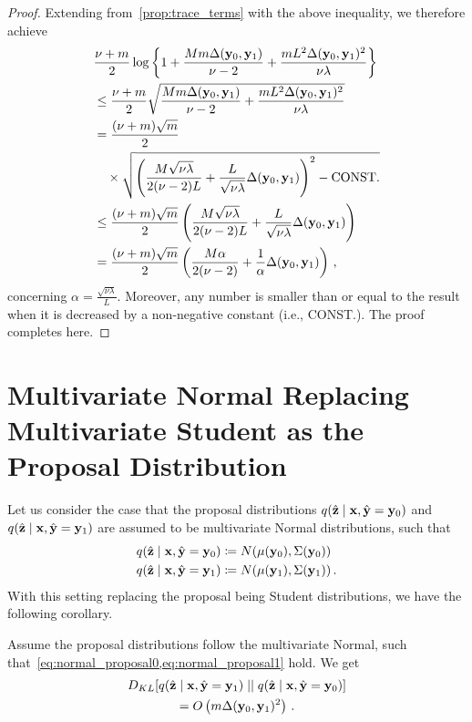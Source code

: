 {\begin{proof}
Extending from~\cref{prop:trace_terms} with the above inequality, we therefore achieve  
\begin{align*}
&\frac{\nu+m}{2} \log \left\{ 1 + \frac{M m \Delta(\mathbf{y}_0, \mathbf{y}_1)}{\nu-2} + \frac{m L^2 \Delta(\mathbf{y}_0, \mathbf{y}_1)^2}{\nu \lambda} \right\} \\
&\le \frac{\nu+m}{2} \sqrt{ \frac{M m \Delta(\mathbf{y}_0, \mathbf{y}_1)}{\nu-2} + \frac{m L^2 \Delta(\mathbf{y}_0, \mathbf{y}_1)^2}{\nu \lambda} } \\
&= \frac{(\nu+m) \sqrt{m}}{2} \\
&\quad \times \sqrt{ \left(\frac{M \sqrt{\nu \lambda}}{ 2 (\nu - 2) L} + \frac{L}{\sqrt{\nu \lambda}} \Delta(\mathbf{y}_0, \mathbf{y}_1) \right)^2 - \mathrm{CONST.} } \\
&\le \frac{(\nu+m) \sqrt{m}}{2} \left( \frac{M \sqrt{\nu \lambda} }{2(\nu-2) L} + \frac{L}{\sqrt{\nu \lambda}}\Delta(\mathbf{y}_0, \mathbf{y}_1) \right) \\&= \frac{(\nu+m) \sqrt{m}}{2} \left( \frac{M \alpha}{2(\nu-2)} + \frac{1}{\alpha} \Delta(\mathbf{y}_0, \mathbf{y}_1) \right) \,, 
\end{align*} 
concerning $\alpha = \frac{\sqrt{\nu \lambda}}{L}$.
Moreover, any number is smaller than or equal to the result when it is decreased by a non-negative constant (i.e., CONST.).
The proof completes here. 
\end{proof}

\section{Multivariate Normal Replacing Multivariate Student as the Proposal Distribution}
\label{ap:normal_proposal}
Let us consider the case that the proposal distributions $q(\hat{\mathbf{z}} \mid \mathbf{x}, \hat{\mathbf{y}}=\mathbf{y}_0)$ and $q(\hat{\mathbf{z}} \mid \mathbf{x}, \hat{\mathbf{y}}=\mathbf{y}_1)$ are assumed to be multivariate Normal distributions, such that 
\begin{align}
q(\hat{\mathbf{z}} \mid \mathbf{x}, \hat{\mathbf{y}}=\mathbf{y}_0) &\coloneqq N(\mu(\mathbf{y}_0), \Sigma(\mathbf{y}_0)) \label{eq:normal_proposal0} \\ 
q(\hat{\mathbf{z}} \mid \mathbf{x}, \hat{\mathbf{y}}=\mathbf{y}_1) &\coloneqq N(\mu(\mathbf{y}_1), \Sigma(\mathbf{y}_1)) \label{eq:normal_proposal1}\,.
\end{align}
With this setting replacing the proposal being Student distributions, we have the following corollary.
\begin{corollary}
Assume the proposal distributions follow the multivariate Normal, such that~\cref{eq:normal_proposal0,eq:normal_proposal1} hold.
We get  
\begin{multline}
  D_{KL} [ q(\hat{\mathbf{z}} \mid \mathbf{x}, \hat{\mathbf{y}}=\mathbf{y}_1) \mid \mid q(\hat{\mathbf{z}} \mid \mathbf{x}, \hat{\mathbf{y}}=\mathbf{y}_0)] \\ 
  = O \left( m \Delta(\mathbf{y}_0, \mathbf{y}_1)^2 \right) \,.
\end{multline}
\end{corollary}

}
